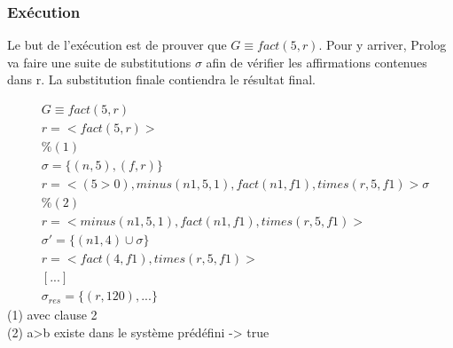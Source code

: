 \subsubsection{Exécution} 
Le but de l'exécution est de prouver que $G \equiv fact(5, r)$. Pour y arriver, Prolog va faire une suite de substitutions $\sigma$ afin de vérifier les affirmations contenues dans r. La substitution finale contiendra le résultat final.

\begin{align*}
& G \equiv fact(5,r) \\
& r= < fact(5, r) > \\
& \% (1) \\
& \sigma = \{ (n, 5), (f, r) \} \\
& r= < ( 5>0 ), minus(n1, 5, 1), fact(n1, f1), times(r, 5, f1) > \sigma \\
& \% (2) \\
& r= < minus(n1, 5, 1), fact(n1, f1), times(r, 5, f1) > \\
& \sigma'= \{ (n1, 4) \cup \sigma\} \\
& r= < fact (4, f1), times(r, 5, f1) > \\
& [...]\\
& \sigma_{res} = \{(r,120),...\} 
\end{align*}
(1) avec clause 2\\
(2) a>b existe dans le système prédéfini -> true\\


